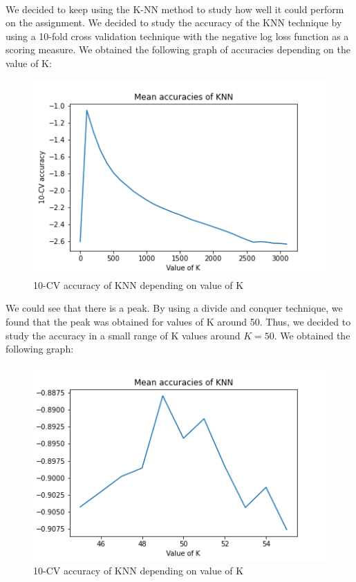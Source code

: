 \documentclass[a4paper, 11pt, oneside]{article}
\begin{document}
\paragraph{}We decided to keep using the K-NN method to study how well it could perform on the assignment. We decided to study the accuracy of the KNN technique by using a 10-fold cross validation technique with the negative log loss function as a scoring measure. We obtained the following graph of accuracies depending on the value of K:
\begin{figure}[H]
\center
\includegraphics[scale=0.3]{knn/log_loss.png}
\caption{10-CV accuracy of KNN depending on value of K}
\end{figure}
We could see that there is a peak. By using a divide and conquer technique, we found that the peak was obtained for values of K around 50. Thus, we decided to study the accuracy in a small range of K values around $K=50$. We obtained the following graph:
\begin{figure}[H]
\center
\includegraphics[scale=0.4]{knn/log_loss_focused.png}
\caption{10-CV accuracy of KNN depending on value of K}
\label{knn_log_loss_focused}
\end{figure}
\end{document}
